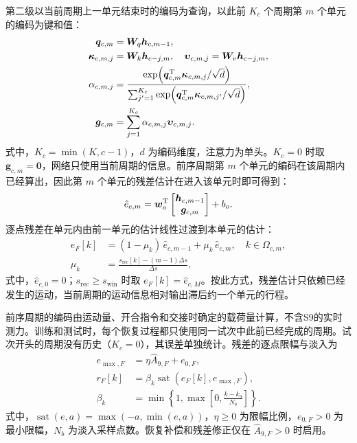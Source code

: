 \documentclass{JQRnew}
\begin{document}
第二级以当前周期上一单元结束时的编码为查询，以此前 $K_c$ 个周期第 $m$ 个单元的编码为键和值：
\begin{equation}
\label{eq:cross-cycle}
\begin{aligned}
\bm q_{c,m}&=\bm W_q\bm h_{c,m-1},\\
\bm\kappa_{c,m,j}&=\bm W_k\bm h_{c-j,m},\quad
\bm\upsilon_{c,m,j}=\bm W_v\bm h_{c-j,m},\\
\alpha_{c,m,j}&=\frac{\exp\!\left(\bm q_{c,m}^{\rm T}\bm\kappa_{c,m,j}/\sqrt d\right)}
{\sum_{j'=1}^{K_c}\exp\!\left(\bm q_{c,m}^{\rm T}\bm\kappa_{c,m,j'}/\sqrt d\right)},\\
\bm g_{c,m}&=\sum_{j=1}^{K_c}\alpha_{c,m,j}\bm\upsilon_{c,m,j}.
\end{aligned}
\end{equation}
式中，$K_c=\min(K,c-1)$，$d$ 为编码维度，注意力为单头。$K_c=0$ 时取 $\bm g_{c,m}=\bm 0$，网络只使用当前周期的信息。前序周期第 $m$ 个单元的编码在该周期内已经算出，因此第 $m$ 个单元的残差估计在进入该单元时即可得到：
\begin{equation}
\label{eq:cell-output}
\hat e_{c,m}=\bm w_o^{\rm T}
\begin{bmatrix}\bm h_{c,m-1}\\\bm g_{c,m}\end{bmatrix}+b_o .
\end{equation}
逐点残差在单元内由前一单元的估计线性过渡到本单元的估计：
\begin{equation}
\label{eq:cell-interp}
\begin{aligned}
e_F[k]&=(1-\mu_k)\,\hat e_{c,m-1}+\mu_k\,\hat e_{c,m},\quad k\in\Omega_{c,m},\\
\mu_k&=\frac{s_{\mathrm{rec}}[k]-(m-1)\Delta s}{\Delta s},
\end{aligned}
\end{equation}
式中，$\hat e_{c,0}=0$；$s_{\mathrm{rec}}\ge s_{\mathrm{win}}$ 时取 $e_F[k]=\hat e_{c,M}$。按此方式，残差估计只依赖已经发生的运动，当前周期的运动信息相对输出滞后约一个单元的行程。

前序周期的编码由运动量、开合指令和交接时确定的载荷量计算，不含S9的实时测力。训练和测试时，每个恢复过程都只使用同一试次中此前已经完成的周期。试次开头的周期没有历史（$K_c=0$），其误差单独统计。残差的逐点限幅与淡入为
\begin{equation}
\label{eq:residual-limit}
\begin{aligned}
e_{\max,F}&=\eta\widehat A_{9,F}+e_{0,F},\\
r_F[k]&=\beta_k\operatorname{sat}(e_F[k],e_{\max,F}),\\
\beta_k&=\min\!\left\{1,\max\!\left[0,\frac{k-k_9}{N_b}\right]\right\}.
\end{aligned}
\end{equation}
式中，$\operatorname{sat}(e,a)=\max(-a,\min(e,a))$，$\eta\ge0$ 为限幅比例，$e_{0,F}>0$ 为最小限幅，$N_b$ 为淡入采样点数。恢复补偿和残差修正仅在 $\widehat A_{9,F}>0$ 时启用。
\end{document}
